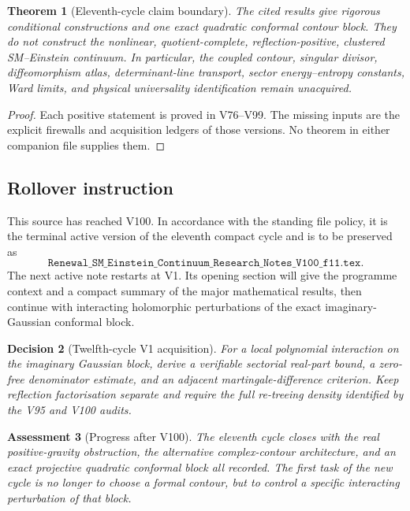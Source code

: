 \documentclass[11pt]{article}
\newtheorem{theorem}{Theorem}[section]
\newtheorem{assessment}[theorem]{Assessment}
\newtheorem{decision}[theorem]{Decision}
\begin{document}
\begin{theorem}[Eleventh-cycle claim boundary]
\label{thm:v11v100-boundary}
The cited results give rigorous conditional constructions and one
exact quadratic conformal contour block.  They do not construct the
nonlinear, quotient-complete, reflection-positive, clustered
SM--Einstein continuum.  In particular, the coupled contour,
singular divisor, diffeomorphism atlas, determinant-line transport,
sector energy--entropy constants, Ward limits, and physical
universality identification remain unacquired.
\end{theorem}

\begin{proof}
Each positive statement is proved in V76--V99.  The missing inputs are
the explicit firewalls and acquisition ledgers of those versions.
No theorem in either companion file supplies them.
\end{proof}

\subsection{Rollover instruction}

This source has reached V100.  In accordance with the standing file
policy, it is the terminal active version of the eleventh compact
cycle and is to be preserved as
\[
 \texttt{Renewal\_SM\_Einstein\_Continuum\_Research\_Notes\_V100\_f11.tex}.
                                                                    \tag{100.2}
\]
The next active note restarts at V1.  Its opening section will give
the programme context and a compact summary of the major mathematical
results, then continue with interacting holomorphic perturbations of
the exact imaginary-Gaussian conformal block.

\begin{decision}[Twelfth-cycle V1 acquisition]
\label{dec:v11v100-next}
For a local polynomial interaction on the imaginary Gaussian block,
derive a verifiable sectorial real-part bound, a zero-free
denominator estimate, and an adjacent martingale-difference
criterion.  Keep reflection factorisation separate and require the
full re-treeing density identified by the V95 and V100 audits.
\end{decision}

\begin{assessment}[Progress after V100]
\label{ass:v11v100-status}
The eleventh cycle closes with the real positive-gravity obstruction,
the alternative complex-contour architecture, and an exact projective
quadratic conformal block all recorded.  The first task of the new
cycle is no longer to choose a formal contour, but to control a
specific interacting perturbation of that block.
\end{assessment}
\end{document}
